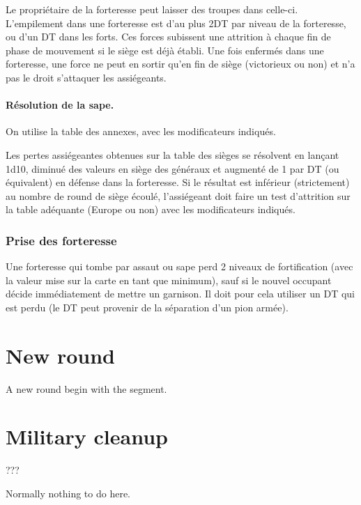 Le propriétaire de la forteresse peut laisser des troupes dans celle-ci.
L'empilement dans une forteresse est d'au plus 2DT par niveau de la
forteresse, ou d'un DT dans les forts. Ces forces subissent une attrition
à chaque fin de phase de mouvement si le siège est déjà
établi. Une fois enfermés dans une forteresse, une force ne peut
en sortir qu'en fin de siège (victorieux ou non) et n'a pas le
droit s'attaquer les assiégeants.

\paragraph{Résolution de la sape.} On utilise la table des annexes,
avec les modificateurs indiqués.

Les pertes assiégeantes obtenues sur la table des sièges se résolvent
en lançant 1d10, diminué des valeurs en siège des généraux
et augmenté de 1 par DT (ou équivalent) en défense dans la forteresse.
Si le résultat est inférieur (strictement) au nombre de round
de siège écoulé, l'assiégeant doit faire un test d'attrition sur la table
adéquante (Europe ou non) avec les modificateurs indiqués.

\subsubsection{Prise des forteresse}
Une forteresse qui tombe par assaut ou sape perd 2 niveaux de
fortification (avec la valeur mise sur la carte en tant que minimum),
sauf si le nouvel occupant décide immédiatement de mettre un
garnison. Il doit pour cela utiliser un DT qui est perdu (le DT peut
provenir de la séparation d'un pion armée).



\section{New round}
A new round begin with the  segment.

\section{Military cleanup}
\label{chMilitary:cleanup}
???

Normally nothing to do here.

